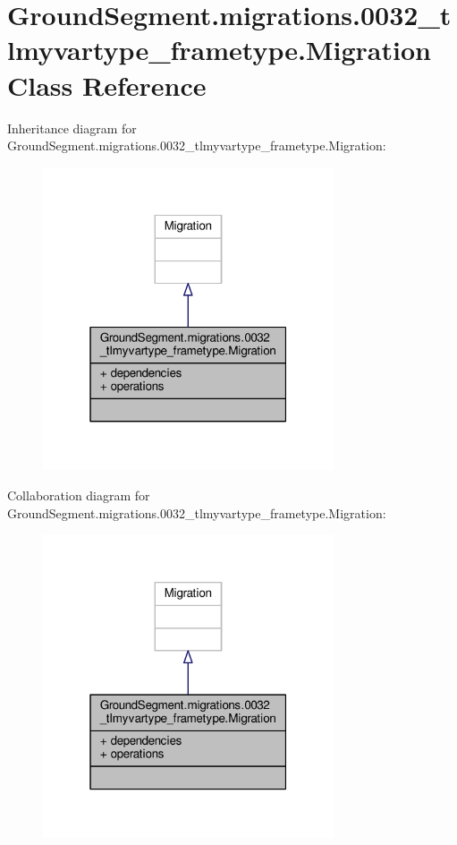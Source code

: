 \hypertarget{class_ground_segment_1_1migrations_1_10032__tlmyvartype__frametype_1_1_migration}{}\section{Ground\+Segment.\+migrations.0032\+\_\+tlmyvartype\+\_\+frametype.Migration Class Reference}
\label{class_ground_segment_1_1migrations_1_10032__tlmyvartype__frametype_1_1_migration}


Inheritance diagram for Ground\+Segment.\+migrations.0032\+\_\+tlmyvartype\+\_\+frametype.Migration\+:\nopagebreak
\begin{figure}[H]
\begin{center}
\leavevmode
\includegraphics[width=244pt]{class_ground_segment_1_1migrations_1_10032__tlmyvartype__frametype_1_1_migration__inherit__graph}
\end{center}
\end{figure}


Collaboration diagram for Ground\+Segment.\+migrations.0032\+\_\+tlmyvartype\+\_\+frametype.Migration\+:\nopagebreak
\begin{figure}[H]
\begin{center}
\leavevmode
\includegraphics[width=244pt]{class_ground_segment_1_1migrations_1_10032__tlmyvartype__frametype_1_1_migration__coll__graph}
\end{center}
\end{figure}
